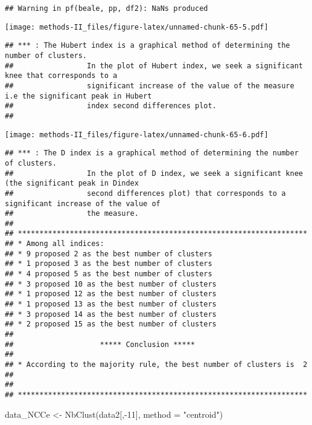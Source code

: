 \documentclass[
]{article}
\newenvironment{Shaded}{\begin{snugshade}}{\end{snugshade}}
\newcommand{\AttributeTok}[1]{\textcolor[rgb]{0.77,0.63,0.00}{#1}}
\newcommand{\DecValTok}[1]{\textcolor[rgb]{0.00,0.00,0.81}{#1}}
\newcommand{\FunctionTok}[1]{\textcolor[rgb]{0.00,0.00,0.00}{#1}}
\newcommand{\NormalTok}[1]{#1}
\newcommand{\OtherTok}[1]{\textcolor[rgb]{0.56,0.35,0.01}{#1}}
\newcommand{\SpecialCharTok}[1]{\textcolor[rgb]{0.00,0.00,0.00}{#1}}
\newcommand{\StringTok}[1]{\textcolor[rgb]{0.31,0.60,0.02}{#1}}
\begin{document}
\begin{verbatim}
## Warning in pf(beale, pp, df2): NaNs produced
\end{verbatim}

\texttt{[image: methods-II\_files/figure-latex/unnamed-chunk-65-5.pdf]}

\begin{verbatim}
## *** : The Hubert index is a graphical method of determining the number of clusters.
##                 In the plot of Hubert index, we seek a significant knee that corresponds to a 
##                 significant increase of the value of the measure i.e the significant peak in Hubert
##                 index second differences plot. 
## 
\end{verbatim}

\texttt{[image: methods-II\_files/figure-latex/unnamed-chunk-65-6.pdf]}

\begin{verbatim}
## *** : The D index is a graphical method of determining the number of clusters. 
##                 In the plot of D index, we seek a significant knee (the significant peak in Dindex
##                 second differences plot) that corresponds to a significant increase of the value of
##                 the measure. 
##  
## ******************************************************************* 
## * Among all indices:                                                
## * 9 proposed 2 as the best number of clusters 
## * 1 proposed 3 as the best number of clusters 
## * 4 proposed 5 as the best number of clusters 
## * 3 proposed 10 as the best number of clusters 
## * 1 proposed 12 as the best number of clusters 
## * 1 proposed 13 as the best number of clusters 
## * 3 proposed 14 as the best number of clusters 
## * 2 proposed 15 as the best number of clusters 
## 
##                    ***** Conclusion *****                            
##  
## * According to the majority rule, the best number of clusters is  2 
##  
##  
## *******************************************************************
\end{verbatim}

\begin{Shaded}
\begin{Highlighting}[]
\NormalTok{data\_NCCe }\OtherTok{\textless{}{-}} \FunctionTok{NbClust}\NormalTok{(data2[,}\SpecialCharTok{{-}}\DecValTok{11}\NormalTok{], }\AttributeTok{method =} \StringTok{"centroid"}\NormalTok{)}
\end{Highlighting}
\end{Shaded}
\end{document}
